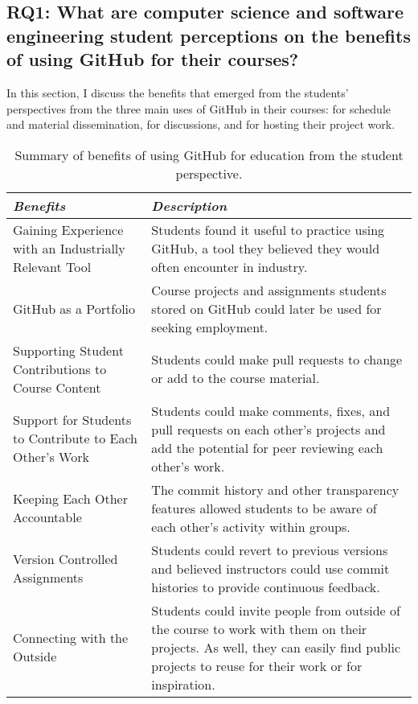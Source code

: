 \subsection{RQ1: What are computer science and software engineering student perceptions on the benefits of using GitHub for their courses?}
In this section, I discuss the benefits that emerged from the students' perspectives from the three main uses of GitHub in their courses: for schedule and material dissemination, for discussions, and for hosting their project work. \\ %

\begin{table}[htp]
    \vspace{1pt}
        \caption{Summary of benefits of using GitHub for education from the student perspective.}\label{table:interviews:students:benefits}
    \vspace{1pt}
    \begin{center}
        \begin{tabular}{ | m{3cm} | m{12cm} | }
            \hline
            \emph{Benefits} & \emph{Description} \\
            \hline
            Gaining Experience with an Industrially Relevant Tool & Students found it useful to practice using GitHub, a tool they believed they would often encounter in industry. \\
            \hline
            GitHub as a Portfolio & Course projects and assignments students stored on GitHub could later be used for seeking employment. \\
            \hline
            Supporting Student Contributions to Course Content & Students could make pull requests to change or add to the course material. \\
            \hline
            Support for Students to Contribute to Each Other's Work & Students could make comments, fixes, and pull requests on each other's projects and add the potential for peer reviewing each other's work. \\
            \hline
            Keeping Each Other Accountable & The commit history and other transparency features allowed students to be aware of each other's activity within groups. \\
            \hline
            Version Controlled Assignments & Students could revert to previous versions and believed instructors could use commit histories to provide continuous feedback. \\
            \hline
            Connecting with the Outside & Students could invite people from outside of the course to work with them on their projects. As well, they can easily find public projects to reuse for their work or for inspiration. \\
            \hline
        \end{tabular}
    \end{center}
\end{table}

